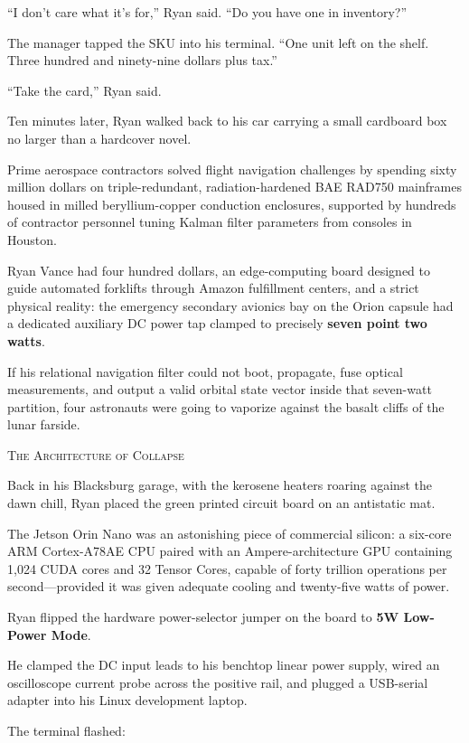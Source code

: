 \documentclass[12pt,twoside,openright]{book}
\newcommand{\sceneheader}[1]{%
  \par\vspace{1.8em}%
  {\noindent\centering\scshape\large #1\par}%
  \vspace{1.0em}%
  \noindent%
}
\newcommand{\dinkus}{%
  \par\vspace{1.2em}%
  {\noindent\centering{\large $\ast\quad\ast\quad\ast$}\par}%
  \vspace{1.2em}%
  \noindent%
}
\begin{document}
``I don't care what it's for,'' Ryan said. ``Do you have one in
inventory?''

The manager tapped the SKU into his terminal. ``One unit left on the
shelf. Three hundred and ninety-nine dollars plus tax.''

``Take the card,'' Ryan said.

Ten minutes later, Ryan walked back to his car carrying a small
cardboard box no larger than a hardcover novel.

Prime aerospace contractors solved flight navigation challenges by
spending sixty million dollars on triple-redundant, radiation-hardened
BAE RAD750 mainframes housed in milled beryllium-copper conduction
enclosures, supported by hundreds of contractor personnel tuning Kalman
filter parameters from consoles in Houston.

Ryan Vance had four hundred dollars, an edge-computing board designed to
guide automated forklifts through Amazon fulfillment centers, and a
strict physical reality: the emergency secondary avionics bay on the
Orion capsule had a dedicated auxiliary DC power tap clamped to
precisely \textbf{seven point two watts}.

If his relational navigation filter could not boot, propagate, fuse
optical measurements, and output a valid orbital state vector inside
that seven-watt partition, four astronauts were going to vaporize
against the basalt cliffs of the lunar farside.

\dinkus

\sceneheader{The Architecture of
Collapse}

Back in his Blacksburg garage, with the kerosene heaters roaring against
the dawn chill, Ryan placed the green printed circuit board on an
antistatic mat.

The Jetson Orin Nano was an astonishing piece of commercial silicon: a
six-core ARM Cortex-A78AE CPU paired with an Ampere-architecture GPU
containing 1,024 CUDA cores and 32 Tensor Cores, capable of forty
trillion operations per second---provided it was given adequate cooling
and twenty-five watts of power.

Ryan flipped the hardware power-selector jumper on the board to
\textbf{5W Low-Power Mode}.

He clamped the DC input leads to his benchtop linear power supply, wired
an oscilloscope current probe across the positive rail, and plugged a
USB-serial adapter into his Linux development laptop.

The terminal flashed:
\end{document}
